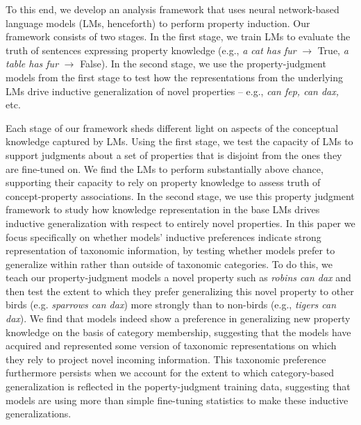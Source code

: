 \documentclass[10pt,letterpaper]{article}
\begin{document}
To this end, we develop an analysis framework that uses neural network-based language models (LMs, henceforth) to perform property induction.
Our framework consists of two stages. 
In the first stage, we train LMs to evaluate the truth of sentences expressing property knowledge (e.g., \textit{a cat has fur} $\rightarrow$ True, \textit{a table has fur} $\rightarrow$ False). 
In the second stage, we use the property-judgment models from the first stage to test how the representations from the underlying LMs drive inductive generalization of novel properties -- e.g., \textit{can fep, can dax,} etc.


Each stage of our framework sheds different light on aspects of the conceptual knowledge captured by LMs.
Using the first stage, we test the capacity of LMs to support judgments about a set of properties that is disjoint from the ones they are fine-tuned on. 
We find the LMs to perform substantially above chance, supporting their capacity to rely on property knowledge to assess truth of concept-property associations.
In the second stage, we use this property judgment framework to study how knowledge representation in the base LMs drives inductive generalization with respect to entirely novel properties. In this paper we focus specifically on whether models' inductive preferences indicate strong representation of taxonomic information, by testing whether models prefer to generalize within rather than outside of taxonomic categories. To do this, we teach our property-judgment models a novel property such as \textit{robins can dax} and then test the extent to which they prefer generalizing this novel property to other birds (e.g. \textit{sparrows can dax}) more strongly than to non-birds (e.g., \textit{tigers can dax}).
We find that models indeed show a preference in generalizing new property knowledge on the basis of category membership, suggesting that the models have acquired and represented some version of taxonomic representations on which they rely to project novel incoming information.
This taxonomic preference furthermore persists when we account for the extent to which category-based generalization is reflected in the poperty-judgment training data, suggesting that models are using more than simple fine-tuning statistics to make these inductive generalizations.
\end{document}
